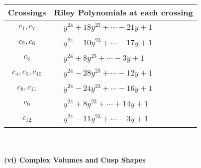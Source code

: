 \documentclass[1p]{elsarticle_modified}
\theoremstyle{definition}
\begin{document}
\begin{tabular}{m{50pt}|m{274pt}}
Crossings & \hspace{64pt}Riley Polynomials at each crossing \\
\hline $$\begin{aligned}c_{1},c_{7}\end{aligned}$$&$\begin{aligned}
&y^{24}+18 y^{23}+\cdots-21 y+1
\end{aligned}$\\
\hline $$\begin{aligned}c_{2},c_{6}\end{aligned}$$&$\begin{aligned}
&y^{24}-10 y^{23}+\cdots-17 y+1
\end{aligned}$\\
\hline $$\begin{aligned}c_{3}\end{aligned}$$&$\begin{aligned}
&y^{24}+8 y^{23}+\cdots-3 y+1
\end{aligned}$\\
\hline $$\begin{aligned}c_{4},c_{5},c_{10}\end{aligned}$$&$\begin{aligned}
&y^{24}-28 y^{23}+\cdots-12 y+1
\end{aligned}$\\
\hline $$\begin{aligned}c_{8},c_{11}\end{aligned}$$&$\begin{aligned}
&y^{24}-24 y^{23}+\cdots-16 y+1
\end{aligned}$\\
\hline $$\begin{aligned}c_{9}\end{aligned}$$&$\begin{aligned}
&y^{24}+8 y^{23}+\cdots+14 y+1
\end{aligned}$\\
\hline $$\begin{aligned}c_{12}\end{aligned}$$&$\begin{aligned}
&y^{24}-11 y^{23}+\cdots-3 y+1
\end{aligned}$\\
\hline
\end{tabular}\\~\\
\newpage\flushleft \textbf{(vi) Complex Volumes and Cusp Shapes}
\end{document}
